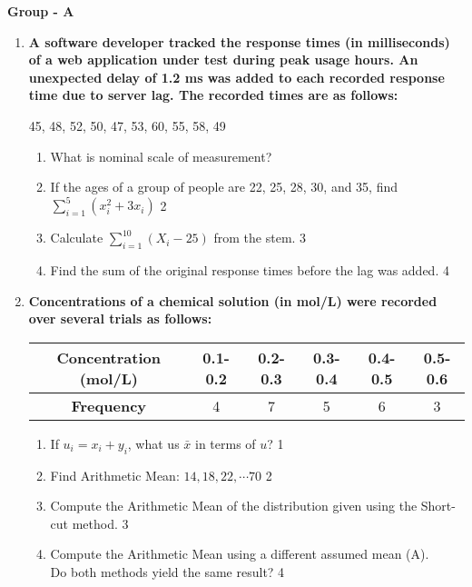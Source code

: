 \documentclass{article}
\begin{document}
\begin{center}
\textbf{Group  - A}

\end{center}
  \begin{enumerate}

  \item
\textbf{A software developer tracked the response times (in milliseconds) 
of a web application under test during peak usage hours. An unexpected 
delay of 1.2 ms was added to each recorded response time due to server
lag. The recorded times are as follows:}

\begin{center}
45, 48, 52, 50, 47, 53, 60, 55, 58, 49
\end{center}

\begin{enumerate}
\item What is nominal scale of measurement?

\item 
If the ages of a group of people are 22, 25, 28, 30, and 35, 
find $\displaystyle \sum_{i=1}^5 (x_i^2 + 3x_i)$ \hfill 2
    \item  
    Calculate $\displaystyle \sum_{i=1}^{10} (X_i - 25)$ from the stem. \hfill 3
    \item
    Find the sum of the original response times before the lag was added.
    \hfill 4
\end{enumerate}

  \item
\textbf{Concentrations of a chemical solution (in mol/L) were recorded over 
several trials as follows:} 

\begin{table}[h]
\centering
\begin{tabular}{c|ccccc}
\textbf{Concentration (mol/L)} & 0.1-0.2 & 0.2-0.3 & 0.3-0.4 & 0.4-0.5 & 0.5-0.6
\\ \hline
\textbf{Frequency}             & 4       & 7       & 5       & 6       & 3       
\end{tabular}
\end{table}

\begin{enumerate}
\item If $u_i = x_i + y_i$, what us $\bar x$ in terms of $u$? \hfill 1
\item Find Arithmetic Mean: $14,18,22, \cdots 70$ \hfill 2
    \item  
    Compute the Arithmetic Mean of the distribution given using 
    the Short-cut method. \hfill 3
    \item
    Compute the Arithmetic Mean using a different assumed mean (A). \\
    Do both methods yield the same result? \hfill 4
\end{enumerate}



\end{enumerate}
\end{document}
